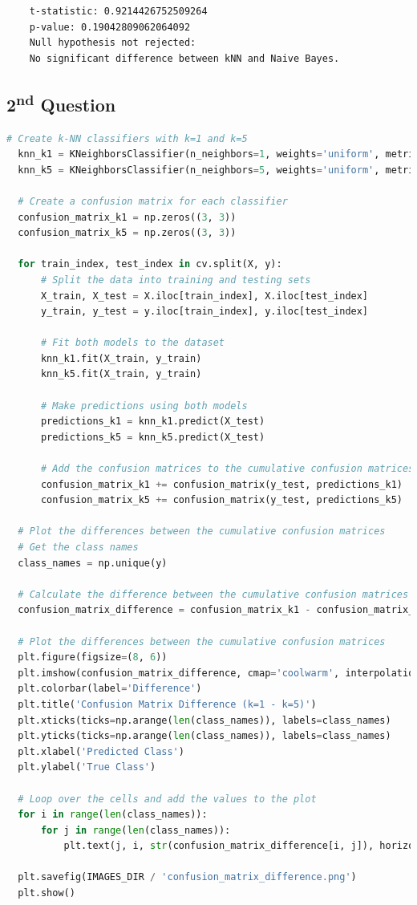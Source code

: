 \documentclass{article}
\begin{document}
  \begin{lstlisting}
    t-statistic: 0.9214426752509264
    p-value: 0.19042809062064092
    Null hypothesis not rejected: 
    No significant difference between kNN and Naive Bayes.
  \end{lstlisting}




\subsection*{2\textsuperscript{nd} Question}

\begin{lstlisting}[language=Python]
  # Create k-NN classifiers with k=1 and k=5
  knn_k1 = KNeighborsClassifier(n_neighbors=1, weights='uniform', metric='euclidean')
  knn_k5 = KNeighborsClassifier(n_neighbors=5, weights='uniform', metric='euclidean')

  # Create a confusion matrix for each classifier
  confusion_matrix_k1 = np.zeros((3, 3))
  confusion_matrix_k5 = np.zeros((3, 3))

  for train_index, test_index in cv.split(X, y):
      # Split the data into training and testing sets
      X_train, X_test = X.iloc[train_index], X.iloc[test_index]
      y_train, y_test = y.iloc[train_index], y.iloc[test_index]

      # Fit both models to the dataset
      knn_k1.fit(X_train, y_train)
      knn_k5.fit(X_train, y_train)

      # Make predictions using both models
      predictions_k1 = knn_k1.predict(X_test)
      predictions_k5 = knn_k5.predict(X_test)

      # Add the confusion matrices to the cumulative confusion matrices
      confusion_matrix_k1 += confusion_matrix(y_test, predictions_k1)
      confusion_matrix_k5 += confusion_matrix(y_test, predictions_k5)

  # Plot the differences between the cumulative confusion matrices
  # Get the class names
  class_names = np.unique(y)

  # Calculate the difference between the cumulative confusion matrices
  confusion_matrix_difference = confusion_matrix_k1 - confusion_matrix_k5

  # Plot the differences between the cumulative confusion matrices
  plt.figure(figsize=(8, 6))
  plt.imshow(confusion_matrix_difference, cmap='coolwarm', interpolation='nearest')
  plt.colorbar(label='Difference')
  plt.title('Confusion Matrix Difference (k=1 - k=5)')
  plt.xticks(ticks=np.arange(len(class_names)), labels=class_names)
  plt.yticks(ticks=np.arange(len(class_names)), labels=class_names)
  plt.xlabel('Predicted Class')
  plt.ylabel('True Class')

  # Loop over the cells and add the values to the plot
  for i in range(len(class_names)):
      for j in range(len(class_names)):
          plt.text(j, i, str(confusion_matrix_difference[i, j]), horizontalalignment='center', verticalalignment='center')
  
  plt.savefig(IMAGES_DIR / 'confusion_matrix_difference.png')
  plt.show()
\end{lstlisting}
\end{document}
